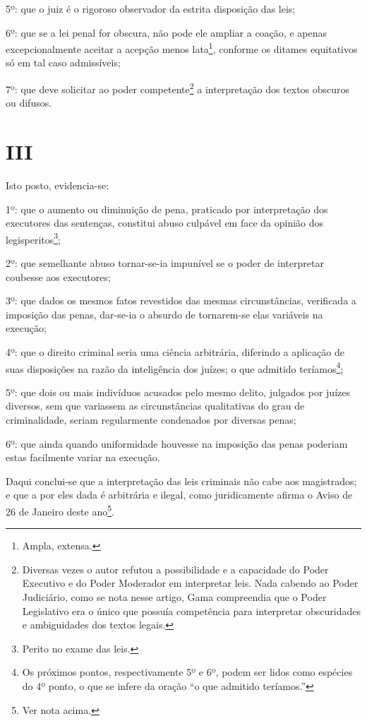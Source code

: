 5º: que o juiz é o rigoroso observador da estrita disposição das leis;

6º: que se a lei penal for obscura, não pode ele ampliar a coação, e
apenas excepcionalmente aceitar a acepção menos lata\footnote{Ampla,
  extensa.}, conforme os ditames equitativos só em tal caso admissíveis;

7º: que deve solicitar ao poder competente\footnote{Diversas vezes o
  autor refutou a possibilidade e a capacidade do Poder Executivo e do
  Poder Moderador em interpretar leis. Nada cabendo ao Poder Judiciário,
  como se nota nesse artigo, Gama compreendia que o Poder Legislativo
  era o único que possuía competência para interpretar obscuridades e
  ambiguidades dos textos legais.} a interpretação dos textos obscuros
ou difusos.

\section{III}

Isto posto, evidencia-se:

1º: que o aumento ou diminuição de pena, praticado por interpretação dos
executores das sentenças, constitui abuso culpável em face da opinião
dos legisperitos\footnote{Perito no exame das leis.};

2º: que semelhante abuso tornar-se-ia impunível se o poder de
interpretar coubesse aos executores;

3º: que dados os mesmos fatos revestidos das mesmas circunstâncias,
verificada a imposição das penas, dar-se-ia o absurdo de tornarem-se
elas variáveis na execução;

4º: que o direito criminal seria uma ciência arbitrária, diferindo a
aplicação de suas disposições na razão da inteligência dos juízes; o que
admitido teríamos\footnote{Os próximos pontos, respectivamente 5º e
  6º, podem ser lidos como espécies do 4º ponto, o que se infere da
  oração ``o que admitido teríamos.''};

5º: que dois ou mais indivíduos acusados pelo mesmo delito, julgados por
juízes diversos, sem que variassem as circunstâncias qualitativas do
grau de criminalidade, seriam regularmente condenados por diversas
penas;

6º: que ainda quando uniformidade houvesse na imposição das penas
poderiam estas facilmente variar na execução.

Daqui conclui-se que a interpretação das leis criminais não cabe aos
magistrados; e que a por eles dada é arbitrária e ilegal, como
juridicamente afirma o Aviso de 26 de Janeiro deste ano\footnote{Ver
  nota acima.}.

